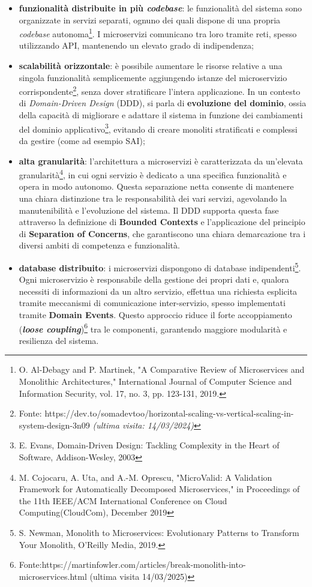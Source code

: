             \begin{itemize}
                \item \textbf{funzionalità distribuite in più \textit{codebase}}: le funzionalità del sistema sono organizzate in servizi separati, ognuno dei quali dispone di una propria \textit{codebase} autonoma\footnote{O. Al-Debagy and P. Martinek, "A Comparative Review of Microservices and Monolithic Architectures," International Journal of Computer Science and Information Security, vol. 17, no. 3, pp. 123-131, 2019.}. I microservizi comunicano tra loro tramite reti, spesso utilizzando API, mantenendo un elevato grado di indipendenza;
                \item \textbf{scalabilità orizzontale}: è possibile aumentare le risorse relative a una singola funzionalità semplicemente aggiungendo istanze del microservizio corrispondente\footnote{Fonte: https://dev.to/somadevtoo/horizontal-scaling-vs-vertical-scaling-in-system-design-3n09 \textit{(ultima visita: 14/03/2024)}}, senza dover stratificare l'intera applicazione. In un contesto di \textit{Domain-Driven Design} (DDD), si parla di \textbf{evoluzione del dominio}, ossia della capacità di migliorare e adattare il sistema in funzione dei cambiamenti del dominio applicativo\footnote{E. Evans, Domain-Driven Design: Tackling Complexity in the Heart of Software, Addison-Wesley, 2003}, evitando di creare monoliti stratificati e complessi da gestire (come ad esempio SAI);
                \item \textbf{alta granularità}: l'architettura a microservizi è caratterizzata da un'elevata granularità\footnote{M. Cojocaru, A. Uta, and A.-M. Oprescu, "MicroValid: A Validation Framework for Automatically Decomposed Microservices," in Proceedings of the 11th IEEE/ACM International Conference on Cloud Computing(CloudCom), December 2019}, in cui ogni servizio è dedicato a una specifica funzionalità e opera in modo autonomo. Questa separazione netta consente di mantenere una chiara distinzione tra le responsabilità dei vari servizi, agevolando la manutenibilità e l'evoluzione del sistema. Il DDD supporta questa fase attraverso la definizione di \textbf{Bounded Contexts} e l'applicazione del principio di \textbf{Separation of Concerns}, che garantiscono una chiara demarcazione tra i diversi ambiti di competenza e funzionalità.  
                \item \textbf{database distribuito}: i microservizi dispongono di database indipendenti\footnote{S. Newman, Monolith to Microservices: Evolutionary Patterns to Transform Your Monolith, O'Reilly Media, 2019.}. Ogni microservizio è responsabile della gestione dei propri dati e, qualora necessiti di informazioni da un altro servizio, effettua una richiesta esplicita tramite meccanismi di comunicazione inter-servizio, spesso implementati tramite \textbf{Domain Events}. Questo approccio riduce il forte accoppiamento (\textbf{\textit{loose coupling}})\footnote{Fonte:https://martinfowler.com/articles/break-monolith-into-microservices.html (ultima visita 14/03/2025)} tra le componenti, garantendo maggiore modularità e resilienza del sistema. 
            \end{itemize}  

